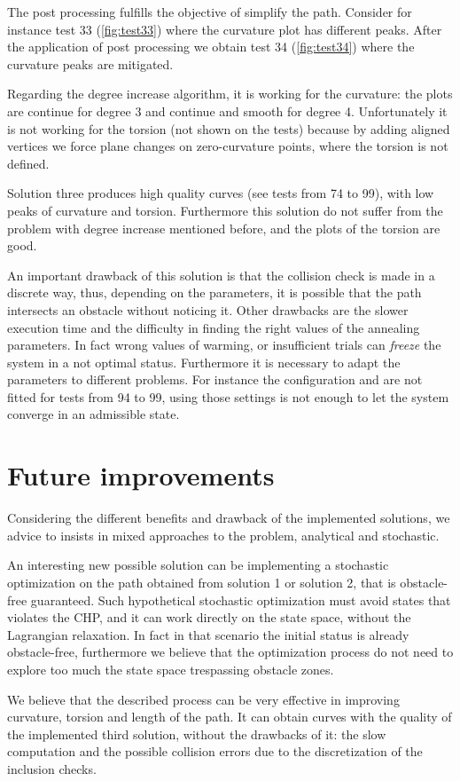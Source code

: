 \documentclass[dissertation.tex]{subfiles}
\begin{document}
The post processing fulfills the
objective of simplify the path. Consider for instance test 33
(\cref{fig:test33}) where the curvature plot has different
peaks. After the application of post processing we obtain test 34
(\cref{fig:test34}) where the curvature peaks are mitigated.

Regarding the degree increase algorithm, it is working for the
curvature: the plots are continue for degree 3 and continue and
smooth for degree 4. Unfortunately it is not working for the torsion
(not shown on the tests) because by adding aligned vertices we force
plane changes on zero-curvature points, where the torsion is not
defined.

Solution three produces high quality curves (see tests from 74 to 99),
with low peaks of curvature and torsion. Furthermore this solution do
not suffer from the problem with degree increase mentioned before, and
the plots of the torsion are good.

An important drawback of this
solution is that the collision check is made in a discrete way, thus,
depending on the parameters, it is possible that the path intersects
an obstacle without noticing it.
Other drawbacks are the slower
execution time and the difficulty in finding the right values of the
annealing parameters. In fact wrong values of warming, or insufficient
trials can \emph{freeze} the system in a not optimal
status. Furthermore it is necessary to adapt the parameters to
different problems. For instance the configuration \annB and \annC are
not fitted for tests from 94 to 99, using those settings is not enough
to let the system converge in an admissible state.



\section{Future improvements}
Considering the different benefits and drawback of the implemented
solutions, we advice to insists in mixed approaches to the
problem, analytical and stochastic.

An interesting new possible solution can be implementing a
stochastic optimization on the path obtained from solution 1 or
solution 2, that is obstacle-free guaranteed. Such hypothetical stochastic
optimization must avoid states that violates the \ac{CHP}, and it can
work directly on the state space, without the Lagrangian
relaxation. In fact in that scenario the initial status is already
obstacle-free, furthermore we believe that the optimization process do
not need to explore too much the state space trespassing obstacle
zones.

We believe that the described process can be very effective in
improving curvature, torsion and length of the path. It can obtain
curves with the quality of the implemented third solution, without the
drawbacks of it: the slow computation and the possible collision
errors due to the discretization of the inclusion checks.
\end{document}
